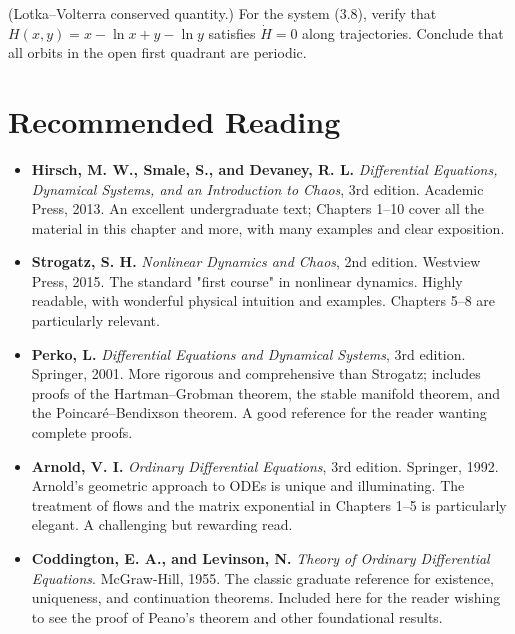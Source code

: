 \begin{exercise}
(Lotka--Volterra conserved quantity.) For the system (3.8), verify that $H(x,y) = x - \ln x + y - \ln y$ satisfies $\dot{H} = 0$ along trajectories. Conclude that all orbits in the open first quadrant are periodic.


\bigskip

\end{exercise}


\section*{Recommended Reading}

\begin{itemize}[nosep]
  \item \textbf{Hirsch, M. W., Smale, S., and Devaney, R. L.} \textit{Differential Equations, Dynamical Systems, and an Introduction to Chaos}, 3rd edition. Academic Press, 2013. An excellent undergraduate text; Chapters 1--10 cover all the material in this chapter and more, with many examples and clear exposition.

  \item \textbf{Strogatz, S. H.} \textit{Nonlinear Dynamics and Chaos}, 2nd edition. Westview Press, 2015. The standard "first course" in nonlinear dynamics. Highly readable, with wonderful physical intuition and examples. Chapters 5--8 are particularly relevant.

  \item \textbf{Perko, L.} \textit{Differential Equations and Dynamical Systems}, 3rd edition. Springer, 2001. More rigorous and comprehensive than Strogatz; includes proofs of the Hartman--Grobman theorem, the stable manifold theorem, and the Poincar\'e--Bendixson theorem. A good reference for the reader wanting complete proofs.

  \item \textbf{Arnold, V. I.} \textit{Ordinary Differential Equations}, 3rd edition. Springer, 1992. Arnold's geometric approach to ODEs is unique and illuminating. The treatment of flows and the matrix exponential in Chapters 1--5 is particularly elegant. A challenging but rewarding read.

  \item \textbf{Coddington, E. A., and Levinson, N.} \textit{Theory of Ordinary Differential Equations}. McGraw-Hill, 1955. The classic graduate reference for existence, uniqueness, and continuation theorems. Included here for the reader wishing to see the proof of Peano's theorem and other foundational results.
\end{itemize}
